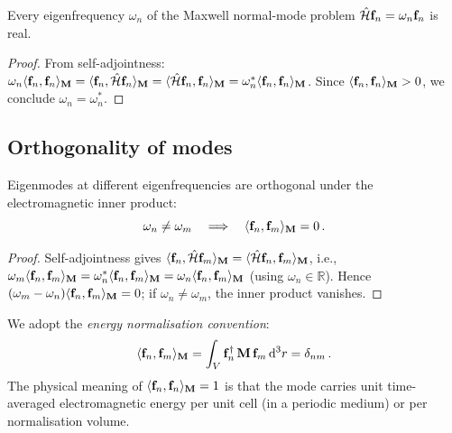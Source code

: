 \begin{corollary}
  \label{cor:ch3-real-omega}
  Every eigenfrequency $\omega_n$ of the Maxwell normal-mode problem
  $\hat{\mathcal{H}}\mathbf{f}_n=\omega_n\mathbf{f}_n$ is real.
\end{corollary}

\begin{proof}
From self-adjointness:
$\omega_n\langle \mathbf{f}_n , \mathbf{f}_n \rangle_{\mathbf{M}}
=\langle \mathbf{f}_n , \hat{\mathcal{H}}\mathbf{f}_n \rangle_{\mathbf{M}}
=\langle \hat{\mathcal{H}}\mathbf{f}_n , \mathbf{f}_n \rangle_{\mathbf{M}}
=\omega_n^*\langle \mathbf{f}_n , \mathbf{f}_n \rangle_{\mathbf{M}}$.
Since $\langle \mathbf{f}_n , \mathbf{f}_n \rangle_{\mathbf{M}}>0$, we conclude $\omega_n=\omega_n^*$.
\end{proof}

\subsection{Orthogonality of modes}
\label{sec:ch3-orthogonality} \cite{press2026photonic}

\begin{proposition}
  \label{prop:ch3-orthogonality}
  Eigenmodes at different eigenfrequencies are orthogonal under the
  electromagnetic inner product:
  \begin{equation}\label{eq:ch3-orthogonality}
    \omega_n\neq\omega_m
    \quad\Longrightarrow\quad
    \langle \mathbf{f}_n , \mathbf{f}_m \rangle_{\mathbf{M}}=0\,.
  \end{equation}
\end{proposition}

\begin{proof}
Self-adjointness gives
$\langle \mathbf{f}_n , \hat{\mathcal{H}}\mathbf{f}_m \rangle_{\mathbf{M}}
=\langle \hat{\mathcal{H}}\mathbf{f}_n , \mathbf{f}_m \rangle_{\mathbf{M}}$, i.e.,
$\omega_m\langle \mathbf{f}_n , \mathbf{f}_m \rangle_{\mathbf{M}}
=\omega_n^*\langle \mathbf{f}_n , \mathbf{f}_m \rangle_{\mathbf{M}}
=\omega_n\langle \mathbf{f}_n , \mathbf{f}_m \rangle_{\mathbf{M}}$
(using $\omega_n\in\mathbb{R}$).  Hence
$(\omega_m-\omega_n)\langle \mathbf{f}_n , \mathbf{f}_m \rangle_{\mathbf{M}}=0$; if
$\omega_n\neq\omega_m$, the inner product vanishes.
\end{proof}

We adopt the \emph{energy normalisation convention}:
\begin{equation}\label{eq:ch3-normalisation}
  \langle \mathbf{f}_n , \mathbf{f}_m \rangle_{\mathbf{M}}
  = \int_V\mathbf{f}_n^\dagger\,\mathbf{M}\,\mathbf{f}_m\,\mathrm{d}^3r
  = \delta_{nm}\,.
\end{equation}
The physical meaning of $\langle \mathbf{f}_n , \mathbf{f}_n \rangle_{\mathbf{M}}=1$ is that the
mode carries unit time-averaged electromagnetic energy per unit cell (in
a periodic medium) or per normalisation volume.

